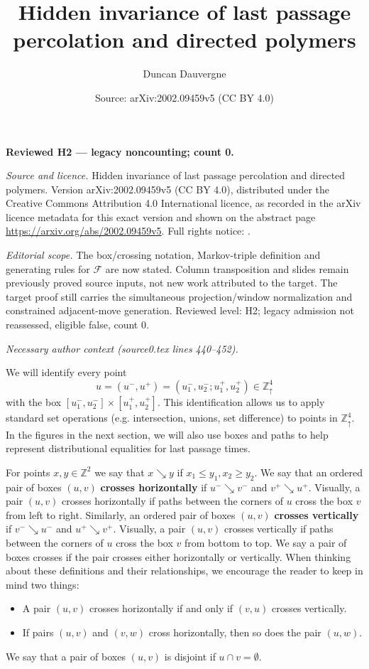 \documentclass[10pt,a4paper]{amsart}
\title[103343: source reading]{Hidden invariance of last passage percolation and directed polymers}
\author{Duncan Dauvergne}
\date{Source: arXiv:2002.09459v5 (CC BY 4.0)}
\newcommand{\X}{\times}
\newcommand{\Zd}{\mathds{Z}^4_\uparrow}
\newcommand{\Z}{\mathds{Z}}
\newcommand{\scrF}{\mathcal{F}}
\begin{document}
\maketitle
\noindent\textbf{Reviewed H2 --- legacy noncounting; count 0.}\par\smallskip
{\raggedright \noindent\emph{Source and licence.} Hidden invariance of last passage percolation and directed polymers. Version arXiv:2002.09459v5 (CC BY 4.0), distributed under the Creative Commons Attribution 4.0 International licence, as recorded in the arXiv licence metadata for this exact version and shown on the abstract page \url{https://arxiv.org/abs/2002.09459v5}. Full rights notice: .\par\smallskip\par}

\noindent\textit{Editorial scope.} The box/crossing notation, Markov-triple definition and generating rules for $\scrF$ are now stated. Column transposition and slides remain previously proved source inputs, not new work attributed to the target. The target proof still carries the simultaneous projection/window normalization and constrained adjacent-move generation. Reviewed level: H2; legacy admission not reassessed, eligible false, count 0.\par\smallskip

\par\medskip\noindent\textit{Necessary author context (source0.tex lines 440--452).}\par\smallskip
We will identify every point 
$$
u = (u^-, u^+) = (u^-_1, u^-_2; u^+_1, u^+_2) \in \Zd
$$
with the box $[u^-_1, u^-_2] \X [u^+_1, u^+_2]$. This identification allows us to apply standard set operations (e.g. intersection, unions, set difference) to points in $\Zd$. In the figures in the next section, we will also use boxes and paths to help represent distributional equalities for last passage times. 

For points $x, y \in \Z^2$ we say that $x \searrow y$ if $x_1 \le y_1, x_2 \ge y_2$. We say that an ordered pair of boxes $(u,v)$ \textbf{crosses horizontally} if $u^- \searrow v^-$ and $v^+ \searrow u^+$. Visually, a pair $(u, v)$ crosses horizontally if paths between the corners of $u$ cross the box $v$ from left to right. Similarly, an ordered pair of boxes $(u,v)$ \textbf{crosses vertically} if $v^- \searrow u^-$ and $u^+ \searrow v^+$. Visually, a pair $(u, v)$ crosses vertically if paths between the corners of $u$ cross the box $v$ from bottom to top. We say a pair of boxes crosses if the pair crosses either horizontally or vertically.
When thinking about these definitions and their relationships, we encourage the reader to keep in mind two things:
\begin{itemize}
	\item A pair $(u, v)$ crosses horizontally if and only if $(v, u)$ crosses vertically.
	\item If pairs $(u, v)$ and $(v, w)$ cross horizontally, then so does the pair $(u, w)$.
\end{itemize} 
 We say that a pair of boxes $(u, v)$ is disjoint if $u \cap v = \emptyset$.
\end{document}

